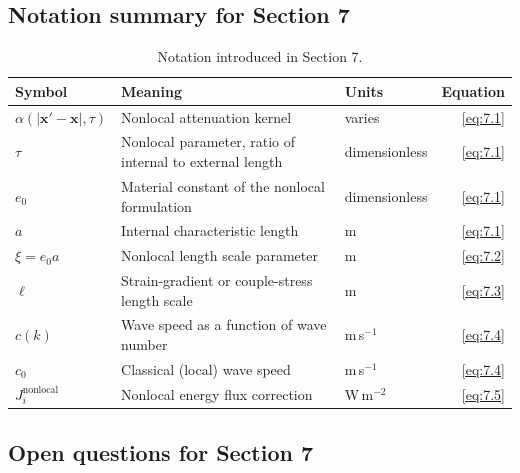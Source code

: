 \subsection{Notation summary for Section 7}

\begin{table}[htbp]
\centering
\small
\caption{Notation introduced in Section 7.}
\label{tab:notation-sec7}
\begin{tabularx}{\textwidth}{@{}lXlr@{}}
\toprule
\textbf{Symbol} & \textbf{Meaning} & \textbf{Units} & \textbf{Equation} \\
\midrule
$\alpha(|\bm{x}'-\bm{x}|,\tau)$ & Nonlocal attenuation kernel & varies & \eqref{eq:7.1} \\
$\tau$ & Nonlocal parameter, ratio of internal to external length & dimensionless & \eqref{eq:7.1} \\
$e_0$ & Material constant of the nonlocal formulation & dimensionless & \eqref{eq:7.1} \\
$a$ & Internal characteristic length & m & \eqref{eq:7.1} \\
$\xi = e_0 a$ & Nonlocal length scale parameter & m & \eqref{eq:7.2} \\
$\ell$ & Strain-gradient or couple-stress length scale & m & \eqref{eq:7.3} \\
$c(k)$ & Wave speed as a function of wave number & m\,s$^{-1}$ & \eqref{eq:7.4} \\
$c_0$ & Classical (local) wave speed & m\,s$^{-1}$ & \eqref{eq:7.4} \\
$J_i^{\mathrm{nonlocal}}$ & Nonlocal energy flux correction & W\,m$^{-2}$ & \eqref{eq:7.5} \\
\bottomrule
\end{tabularx}
\end{table}

\subsection{Open questions for Section 7}

